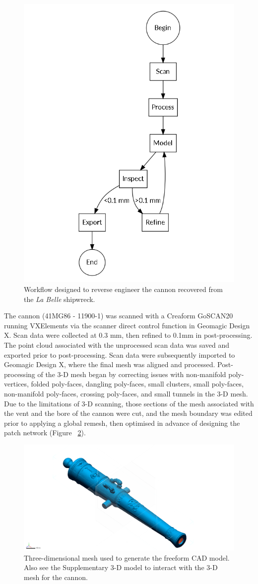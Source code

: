 \documentclass[review]{elsarticle}
\begin{document}
\begin{figure}[ht]\centering
\includegraphics[width=0.6\linewidth]{fig04.png}
\caption{Workflow designed to reverse engineer the cannon recovered from the \textit{La Belle} shipwreck.}
\label{fig:fig04}
\end{figure}

The cannon (41MG86 - 11900-1) was scanned with a Creaform GoSCAN20 running VXElements via the scanner direct control function in Geomagic Design X. Scan data were collected at 0.3 mm, then refined to 0.1mm in post-processing. The point cloud associated with the unprocessed scan data was saved and exported prior to post-processing. Scan data were subsequently imported to Geomagic Design X, where the final mesh was aligned and processed. Post-processing of the 3-D mesh began by correcting issues with non-manifold poly-vertices, folded poly-faces, dangling poly-faces, small clusters, small poly-faces, non-manifold poly-faces, crossing poly-faces, and small tunnels in the 3-D mesh. Due to the limitations of 3-D scanning, those sections of the mesh associated with the vent and the bore of the cannon were cut, and the mesh boundary was edited prior to applying a global remesh, then optimised in advance of designing the patch network (Figure ~\ref{fig:fig05}).

\begin{figure}[ht]\centering
\includegraphics[width=\linewidth]{fig05.png}
\caption{Three-dimensional mesh used to generate the freeform CAD model. Also see the Supplementary 3-D model to interact with the 3-D mesh for the cannon.}
\label{fig:fig05}
\end{figure}
\end{document}
